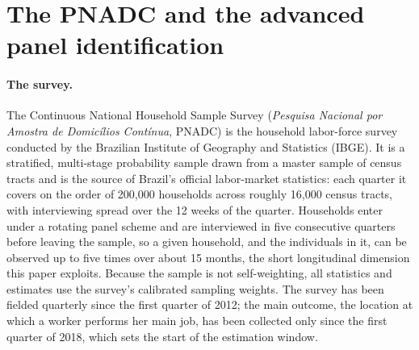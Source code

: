 
\section{The PNADC and the advanced panel identification}\label{app:pnadc}

\paragraph{The survey.} The Continuous National Household Sample Survey (\emph{Pesquisa Nacional por Amostra de Domicílios Cont\'inua}, PNADC) is the household labor-force survey conducted by the Brazilian Institute of Geography and Statistics (IBGE). It is a stratified, multi-stage probability sample drawn from a master sample of census tracts and is the source of Brazil's official labor-market statistics: each quarter it covers on the order of 200,000 households across roughly 16,000 census tracts, with interviewing spread over the 12 weeks of the quarter. Households enter under a rotating panel scheme and are interviewed in five consecutive quarters before leaving the sample, so a given household, and the individuals in it, can be observed up to five times over about 15 months, the short longitudinal dimension this paper exploits. Because the sample is not self-weighting, all statistics and estimates use the survey's calibrated sampling weights. The survey has been fielded quarterly since the first quarter of 2012; the main outcome, the location at which a worker performs her main job, has been collected only since the first quarter of 2018, which sets the start of the estimation window.

